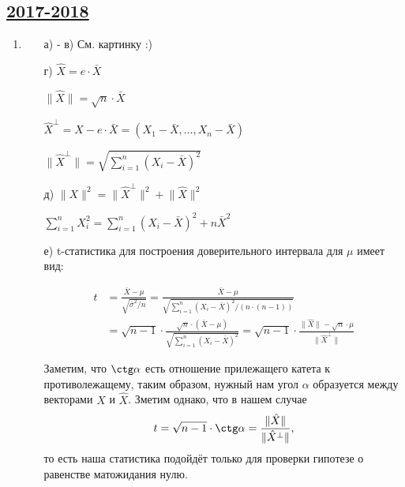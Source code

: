 \subsection[2017-2018]{\hyperref[sec:kr_03_ip_2017_2018]{2017-2018}}
\label{sec:sol_kr_03_ip_2017_2018}



\begin{enumerate}
\item
\begin{enumerate}
	\item[а) - в)] См. картинку :)
\begin{figure}[h!]
\centering
{}
\end{figure}
\item[г)] $\hat{X}=e\cdot\bar{X}$

$\lVert \hat{X} \rVert=\sqrt{n}\cdot\bar{X}$

$\hat{X}^{\perp}=X-e\cdot\bar{X}=(X_1-\bar{X}, \dots ,X_n-\bar{X})$

$\lVert\hat{X}^{\perp} \rVert =\sqrt{\sum^n_{i=1}(X_i-\bar{X})^2}$

\item[д)] $ \lVert X \rVert^2=\lVert\hat{X}^{\perp}\rVert^2+\lVert\hat{X}\rVert^2$

$\sum^n_{i=1}X^2_i=\sum^n_{i=1}(X_i-\bar{X})^2+n\bar{X}^2$

\item[е)] t-статистика для построения доверительного интервала для $\mu$ имеет вид:

\begin{align*}
t &= \frac{\bar{X}-\mu}{\sqrt{\bar{\sigma}^2/n}} = \frac{\bar{X}-\mu}{\sqrt{\sum^n_{i=1}(X_i-\bar{X})^2/(n\cdot(n-1))}}\\
& =\sqrt{n-1}\cdot\frac{\sqrt{n}\cdot(\bar{X}-\mu)}{\sqrt{\sum^n_{i=1}(X_i-\bar{X})^2}}=\sqrt{n-1}\cdot\frac{\lVert \hat{X} \rVert-\sqrt{n}\cdot\mu}{\lVert\hat{X}^{\perp} \rVert}
\end{align*}

Заметим, что $\ctg \alpha$ есть отношение прилежащего катета к противолежащему, таким образом, нужный нам угол $\alpha$ образуется между векторами $X$ и $\hat{X}$. Зметим однако, что в нашем случае
\[
t=\sqrt{n-1}\cdot \ctg \alpha=\frac{\lVert\hat{X}\rVert}{\lVert\hat{X}^{\perp}\rVert},
\]
то есть наша статистика подойдёт только для проверки гипотезе о равенстве матожидания нулю.


\end{enumerate}
\end{enumerate}
